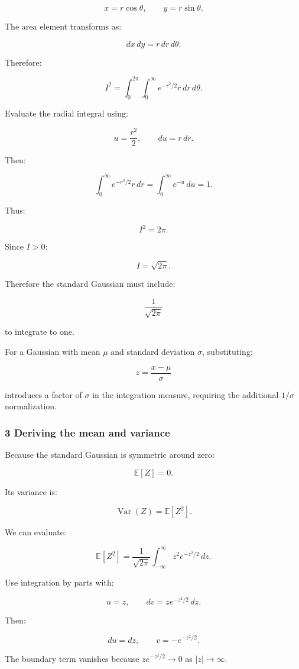 \[
 x=r\cos\theta, \qquad y=r\sin\theta.
\]

The area element transforms as:

\[
 dx\,dy=r\,dr\,d\theta.
\]

Therefore:

\[
 I^2= \int_0^{2\pi}\int_0^\infty e^{-r^2/2}r\,dr\,d\theta.
\]

Evaluate the radial integral using:

\[
 u=\frac{r^2}{2}, \qquad du=r\,dr.
\]

Then:

\[
 \int_0^\infty e^{-r^2/2}r\,dr = \int_0^\infty e^{-u}\,du =1.
\]

Thus:

\[
 I^2=2\pi.
\]

Since \(I>0\):

\[
 \boxed{I=\sqrt{2\pi}}.
\]

Therefore the standard Gaussian must include:

\[
 \frac1{\sqrt{2\pi}}
\]

to integrate to one.

For a Gaussian with mean \(\mu\) and standard deviation \(\sigma\), substituting:

\[
 z=\frac{x-\mu}{\sigma}
\]

introduces a factor of \(\sigma\) in the integration measure, requiring the additional \(1/\sigma\) normalization.

\subsubsection{3 Deriving the mean and variance}\label{02-foundations-ii-ch023-deriving-the-mean-and-variance}

Because the standard Gaussian is symmetric around zero:

\[
 \mathbb E[Z]=0.
\]

Its variance is:

\[
 \operatorname{Var}(Z)=\mathbb E[Z^2].
\]

We can evaluate:

\[
 \mathbb E[Z^2] = \frac1{\sqrt{2\pi}} \int_{-\infty}^{\infty}z^2e^{-z^2/2}\,dz.
\]

Use integration by parts with:

\[
 u=z,\qquad dv=ze^{-z^2/2}\,dz.
\]

Then:

\[
 du=dz, \qquad v=-e^{-z^2/2}.
\]

The boundary term vanishes because \(ze^{-z^2/2}\to0\) as \(|z|\to\infty\).


